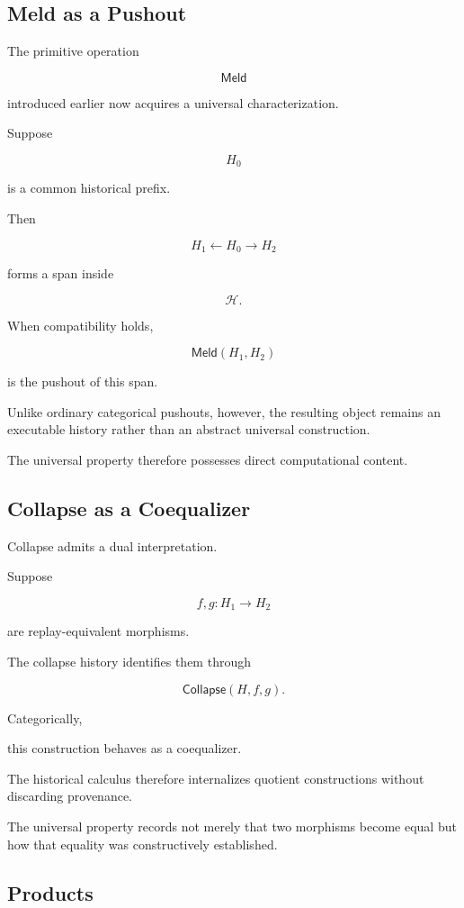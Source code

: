 \documentclass[12pt,oneside]{article}
\theoremstyle{definition}
\theoremstyle{remark}
\newcommand{\Collapse}{\mathsf{Collapse}}
\newcommand{\Meld}{\mathsf{Meld}}
\begin{document}
\subsection{Meld as a Pushout}

The primitive operation

\[
\Meld
\]

introduced earlier now acquires a universal characterization.

Suppose

\[
H_0
\]

is a common historical prefix.

Then

\[
H_1
\leftarrow
H_0
\rightarrow
H_2
\]

forms a span inside

\[
\mathcal H.
\]

When compatibility holds,

\[
\Meld(H_1,H_2)
\]

is the pushout of this span.

Unlike ordinary categorical pushouts, however, the resulting object remains an
executable history rather than an abstract universal construction.

The universal property therefore possesses direct computational content.

\subsection{Collapse as a Coequalizer}

Collapse admits a dual interpretation.

Suppose

\[
f,g
:
H_1
\rightarrow
H_2
\]

are replay-equivalent morphisms.

The collapse history identifies them through

\[
\Collapse(H,f,g).
\]

Categorically,

this construction behaves as a coequalizer.

The historical calculus therefore internalizes quotient constructions without
discarding provenance.

The universal property records not merely that two morphisms become equal but
how that equality was constructively established.

\subsection{Products}
\end{document}
